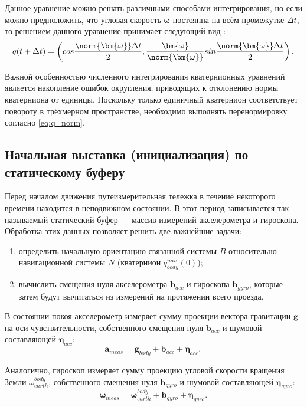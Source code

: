 Данное уравнение можно решать различными способами интегрирования, но если можно предположить, что угловая скорость $\bm{\omega}$ постоянна на всём промежутке $\Delta t$, то решением данного уравнение принимает следующий вид \cite{lurie1961analiticheskaya}:
\begin{equation}
\label{eq:delta_q}
	q(t + \Delta t) = \left( cos \frac{\norm{\bm{\omega}} \Delta t}{2}, \frac{\bm{\omega}}{\norm{\bm{\omega}}} sin \frac{\norm{\bm{\omega}} \Delta t}{2} \right) \text{.}
\end{equation}

Важной особенностью численного интегрирования кватернионных уравнений является накопление ошибок округления, приводящих к отклонению нормы кватерниона от единицы. Поскольку только единичный кватернион соответствует повороту в трёхмерном пространстве, необходимо выполнять перенормировку согласно \eqref{eq:q_norm}.


\subsection{Начальная выставка (инициализация) по статическому буферу}

Перед началом движения путеизмерительная тележка в течение некоторого времени находится в неподвижном состоянии. В этот период записывается так называемый статический буфер — массив измерений акселерометра и гироскопа. Обработка этих данных позволяет решить две важнейшие задачи:
\begin{enumerate}
	\item определить начальную ориентацию связанной системы \(B\) относительно навигационной системы \(N\) (кватернион \(q_{body}^{nav}(0)\));
	\item вычислить смещения нуля акселерометра \(\bm{b}_{acc}\) и гироскопа \(\bm{b}_{gyro}\), которые затем будут вычитаться из измерений на протяжении всего проезда.
\end{enumerate}

В состоянии покоя акселерометр измеряет сумму проекции вектора гравитации \(\bm{g}\) на оси чувствительности, собственного смещения нуля $\bm{b}_{acc}$ и шумовой составляющей $\bm{\eta}_{acc}$:
\begin{equation}
	\bm{a}_{meas} = \bm{g}_{body} + \bm{b}_{acc} + \boldsymbol{\eta}_{acc},
\end{equation}

Аналогично, гироскоп измеряет сумму проекцию угловой скорости вращения Земли $\omega_{earth}^{body}$, собственного смещения нуля $\bm{b}_{gyro}$ и шумовой составляющей $\bm{\eta}_{gyro}$:
\begin{equation}
	\bm{\omega}_{meas} = \bm{\omega}_{earth}^{body} + \bm{b}_{gyro} + \bm{\eta}_{gyro}.
\end{equation}


